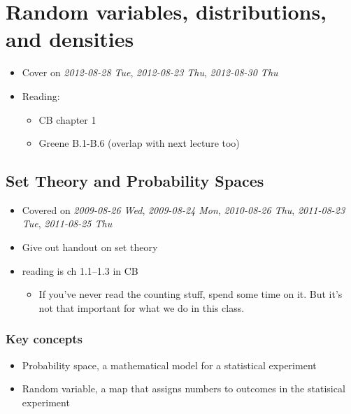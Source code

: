 
\chapter{Random variables, distributions, and densities}

\begin{itemize}
\item Cover on \textit{2012-08-28 Tue}, \textit{2012-08-23 Thu}, \textit{2012-08-30 Thu}
\item Reading:
\begin{itemize}
\item CB chapter 1
\item Greene B.1-B.6 (overlap with next lecture too)
\end{itemize}
\end{itemize}
\section{Set Theory and Probability Spaces}
\label{sec-1}

\begin{itemize}
\item Covered on \textit{2009-08-26 Wed}, \textit{2009-08-24 Mon}, \textit{2010-08-26 Thu},
      \textit{2011-08-23 Tue}, \textit{2011-08-25 Thu}
\item Give out handout on set theory
\item reading is ch 1.1--1.3 in CB
\begin{itemize}
\item If you've never read the counting
        stuff, spend some time on it.  But it's not that important for
        what we do in this class.
\end{itemize}
\end{itemize}
\subsection{Key concepts}
\label{sec-1-1}

\begin{itemize}
\item Probability space, a mathematical model for a statistical experiment
\item Random variable, a map that assigns numbers to outcomes in the
       statisical experiment
\end{itemize}
